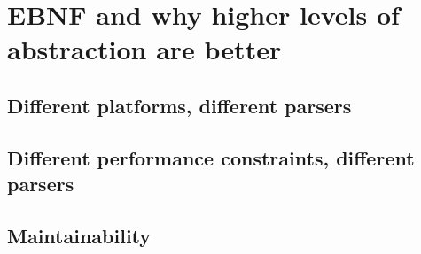\section{EBNF and why higher levels of abstraction are better}

\subsection{Different platforms, different parsers}

\subsection{Different performance constraints, different parsers}

\subsection{Maintainability}

